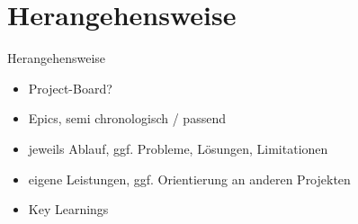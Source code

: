 
\section{Herangehensweise}

\begin{frame}{Herangehensweise}
    \begin{itemize}
        \item Project-Board?
        \item Epics, semi chronologisch / passend
        \item jeweils Ablauf, ggf. Probleme, Lösungen, Limitationen
        \item eigene Leistungen, ggf. Orientierung an anderen Projekten
        \item Key Learnings
    \end{itemize}
\end{frame}
